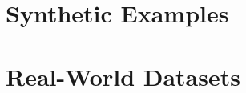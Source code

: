 \documentclass[12pt]{article}
\newcommand{\xb}{\mathbf{x}}
\newcommand{\xc}{\mathbf{x_c}}
\newcommand{\fxc}{f^{(\xc)}}
\newcommand{\fxs}{f^{(x_s)}}
\begin{document}
%
%
%
%
%
%
%
%

\section{Synthetic Examples}

\section{Real-World Datasets}
\end{document}
